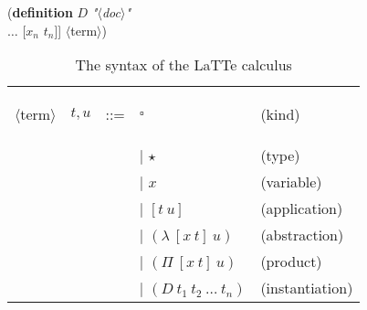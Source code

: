 \documentclass{styles/sig-alternate-05-2015}
\newcommand{\typeterm}{\star}
\newcommand{\kindterm}{\square}
\newcommand{\kw}[1]{\textbf{#1}}
\newcommand{\cmt}[1]{\textit{#1}}
\newcommand{\code}[1]{\begin{sffamily}{\small #1}\end{sffamily}}
\begin{document}
 \begin{table}
\begin{program}
(\kw{definition} $D$ \cmt{"$\langle$doc$\rangle$"}\\
  [[$x_1$ $t_1$] $\ldots$ [$x_n$ $t_n$]]
  $\langle$term$\rangle$)
\end{program}

\begin{tabular}{lllll}
   \code{$\langle$term$\rangle$} & $t,u$ & ::= & $\kindterm$ & (kind) \\
        &       &     & | $\typeterm$ & (type) \\
        &       &     & | $x$ & (variable) \\
        &       &     & | $[t~u]$ & (application) \\
        &       &     & | $(\lambda~[x~t]~u)$ & (abstraction) \\
        &       &     & | $(\Pi~[x~t]~u)$ & (product)\\
        &       &     & | $(D~t_1~t_2~\ldots~t_n)$ & (instantiation)
 \end{tabular}


 \caption{\label{tab:syntax}The syntax of the LaTTe calculus}
 \end{table}
 
\end{document}
